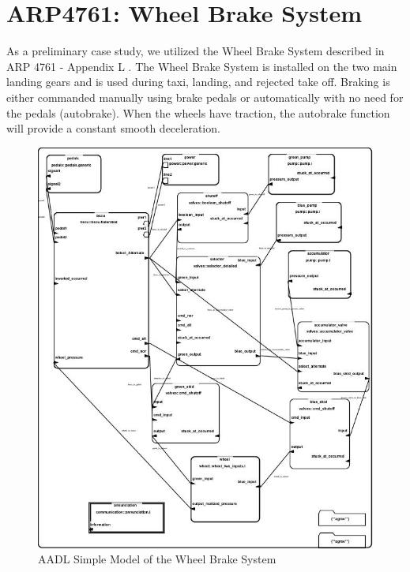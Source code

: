 \section{ARP4761: Wheel Brake System}


As a preliminary case study, we utilized the Wheel Brake System described in ARP 4761 - Appendix L \cite{AIR6110}. The Wheel Brake System is installed on the two main landing gears and is used during taxi, landing, and rejected take off. Braking is either commanded manually using brake pedals or automatically with no need for the pedals (autobrake). When the wheels have traction, the autobrake function will provide a constant smooth deceleration.

\begin{figure}
\begin{center}
\includegraphics[scale=.7]{images/wbsfederated2.jpg}
\caption{AADL Simple Model of the Wheel Brake System }
\label{fig:wbs_ima}
\end{center}
\end{figure}

